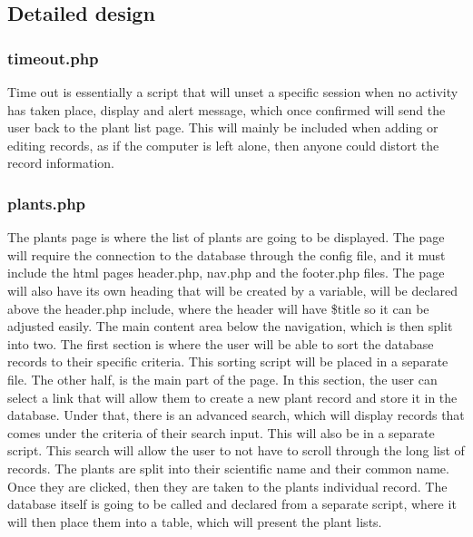 \subsection{Detailed design}

	\subsubsection{timeout.php}
		Time out is essentially a script that will unset a specific session when no activity has taken place, display and alert message, which once confirmed will send the user back to the plant list page. This will mainly be included when adding or editing records, as if the computer is left alone, then anyone could distort the record information.

	\subsubsection{plants.php}
		The plants page is where the list of plants are going to be displayed. The page will require the connection to the database through the config file, and it must include the html pages header.php, nav.php and the footer.php files.  The page will also have its own heading that will be created by a variable, will be declared above the header.php include, where the header will have \$title so it can be adjusted easily. The main content area below the navigation, which is then split into two. The first section is where the user will be able to sort the database records to their specific criteria. This sorting script will be placed in a separate file. The other half, is the main part of the page. In this section, the user can select a link that will allow them to create a new plant record and store it in the database. Under that, there is an advanced search, which will display records that comes under the criteria of their search input. This will also be in a separate script. This search will allow the user to not have to scroll through the long list of records. The plants are split into their scientific name and their common name. Once they are clicked, then they are taken to the plants individual record. The database itself is going to be called and declared from a separate script, where it will then place them into a table, which will present the plant lists.

